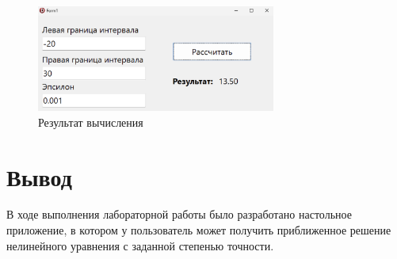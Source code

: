 \documentclass[a4paper, 14pt]{extarticle}
\begin{document}
\begin{figure}[H]
  \centering
  \includegraphics[width=0.7\textwidth]{images/delphi/filled-form.png}
  \caption{Результат вычисления}
  \label{fig:delphi/filled-form}
\end{figure}

\section{Вывод}

В ходе выполнения лабораторной работы было разработано настольное приложение, в
котором у пользователь может получить приближенное решение нелинейного
уравнения с заданной степенью точности.
\end{document}
